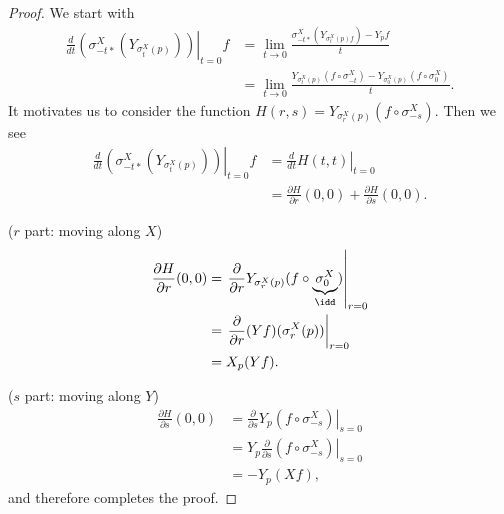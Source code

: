 \documentclass[../main.tex]{subfiles}
\begin{document}
    \begin{proof}
        We start with 
        \[
        \begin{aligned}
            \left.\frac{d}{dt}(\sigma_{-t*}^X(Y_{\sigma^X_t(p)}))\right|_{t=0}f
            &=\lim_{t \to 0} \frac{\sigma^X_{-t*}(Y_{\sigma^X_t(p)f}) - Y_pf}{t} \\
            &=\lim_{t \to 0} \frac{Y_{\sigma^X_t(p)}(f\circ\sigma^X_{-t}) - 
            Y_{\sigma^X_0(p)}(f\circ \sigma^X_0)}{t}.
        \end{aligned}
        \]
        It motivates us to consider the function 
        \(H(r, s) = Y_{\sigma^X_r(p)}(f\circ\sigma^X_{-s})\).
        Then we see 
        \[
        \begin{aligned}
            \left.\frac{d}{dt}(\sigma_{-t*}^X(Y_{\sigma^X_t(p)}))\right|_{t=0}f
            &= \left.\frac{d}{dt}H(t, t)\right|_{t=0} \\
            &=\frac{\partial H}{\partial r}(0, 0) + 
            \frac{\partial H}{\partial s}(0, 0).
        \end{aligned}
        \]
        \par
        (\(r\) part: moving along \(X\))
        \[
        \begin{aligned}
            \frac{\partial H}{\partial r}(0, 0)
            &=\left.\frac{\partial }{\partial r}
            Y_{\sigma^X_r(p)}(f\circ \underbrace{\sigma^X_0}_{\idd})\right|_{r=0} \\
            &=\left.\frac{\partial }{\partial r}
            (Yf)(\sigma^X_r(p))\right|_{r=0} \\
            &=X_p(Yf).
        \end{aligned}
        \]
        \par
        (\(s\) part: moving along \(Y\))
        \[
        \begin{aligned}
            \frac{\partial H}{\partial s}(0, 0)
            &=\left.\frac{\partial }{\partial s}
            Y_{p}(f\circ \sigma^X_{-s})\right|_{s=0} \\
            &=Y_{p}\left.\frac{\partial }{\partial s}
            (f\circ \sigma^X_{-s})\right|_{s=0} \\
            &=-Y_p(Xf),
        \end{aligned}
        \]
        and therefore completes the proof.
    \end{proof}
\end{document}
